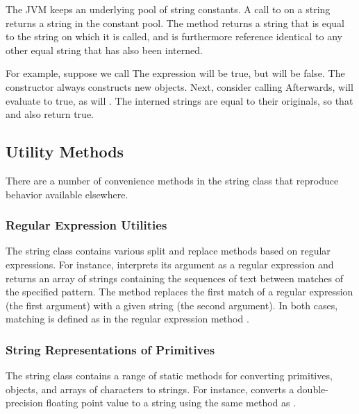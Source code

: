 The JVM keeps an underlying pool of string constants.  A call to
 on a string returns a string in the constant pool.
The method  returns a string that is equal to the
string on which it is called, and is furthermore reference identical
to any other equal string that has also been interned.

For example,  suppose we call
%
%
The expression  will be true, but
 will be false.  The constructor  always
constructs new objects.  Next, consider calling
%
%
Afterwards,  will evaluate to true, as will
.  The interned strings are equal to their
originals, so that  and  also
return true.


\subsection{Utility Methods}

There are a number of convenience methods in the string class that
reproduce behavior available elsewhere.  

\subsubsection{Regular Expression Utilities}

The string class contains various split and replace methods based on
regular expressions.  For instance,  interprets
its argument as a regular expression and returns an array of strings
containing the sequences of text between matches of the specified
pattern.  The method  replaces the
first match of a regular expression (the first argument) with a given
string (the second argument).  In both cases, matching is defined as
in the regular expression method .

\subsubsection{String Representations of Primitives}

The string class contains a range of static 
methods for converting primitives, objects, and arrays of characters
to strings.  For instance,  converts a
double-precision floating point value to a string using the same
method as .

